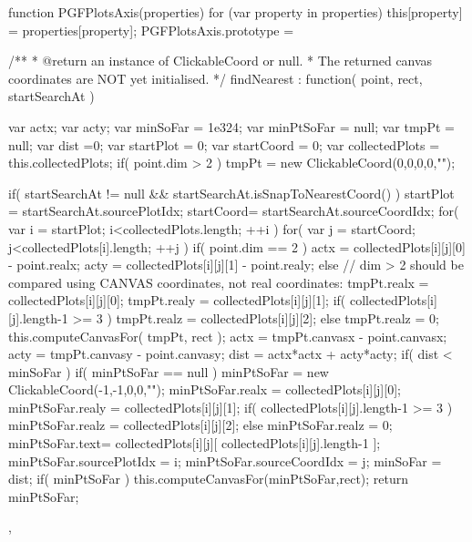 function PGFPlotsAxis(properties) {
	for (var property in properties)
		this[property] = properties[property];
}
PGFPlotsAxis.prototype = {
	/**
	 * @return an instance of ClickableCoord or null.
	 * The returned canvas coordinates are NOT yet initialised.
	 */
	findNearest : function( point, rect, startSearchAt )
	{
		var actx;
		var acty;
		var minSoFar = 1e324;
		var minPtSoFar = null;
		var tmpPt = null;
		var dist =0;
		var startPlot = 0;
		var startCoord = 0;
		var collectedPlots = this.collectedPlots;
		if( point.dim > 2 )
			tmpPt = new ClickableCoord(0,0,0,0,"");

		if( startSearchAt != null && startSearchAt.isSnapToNearestCoord() ) {
			startPlot = startSearchAt.sourcePlotIdx;
			startCoord= startSearchAt.sourceCoordIdx;
		}
		for( var i = startPlot; i<collectedPlots.length; ++i ) {
			for( var j = startCoord; j<collectedPlots[i].length; ++j ) {
				if( point.dim == 2 ) {
					actx = collectedPlots[i][j][0] - point.realx;
					acty = collectedPlots[i][j][1] - point.realy;
				} else {
					// dim > 2 should be compared using CANVAS coordinates, not real coordinates:
					tmpPt.realx = collectedPlots[i][j][0];
					tmpPt.realy = collectedPlots[i][j][1];
					if( collectedPlots[i][j].length-1 >= 3 )
						tmpPt.realz = collectedPlots[i][j][2];
					else
						tmpPt.realz = 0;
					this.computeCanvasFor( tmpPt, rect );
					actx = tmpPt.canvasx - point.canvasx;
					acty = tmpPt.canvasy - point.canvasy;
				}
				dist = actx*actx + acty*acty;
				if( dist < minSoFar ) {
					if( minPtSoFar == null )
						minPtSoFar = new ClickableCoord(-1,-1,0,0,"");
					minPtSoFar.realx = collectedPlots[i][j][0];
					minPtSoFar.realy = collectedPlots[i][j][1];
					if( collectedPlots[i][j].length-1 >= 3 )
						minPtSoFar.realz = collectedPlots[i][j][2];
					else
						minPtSoFar.realz = 0;
					minPtSoFar.text= collectedPlots[i][j][ collectedPlots[i][j].length-1 ];
					minPtSoFar.sourcePlotIdx = i;
					minPtSoFar.sourceCoordIdx = j;
					minSoFar = dist;
				}
			}
		}
		if( minPtSoFar )
			this.computeCanvasFor(minPtSoFar,rect);
		return minPtSoFar;
	},

}
